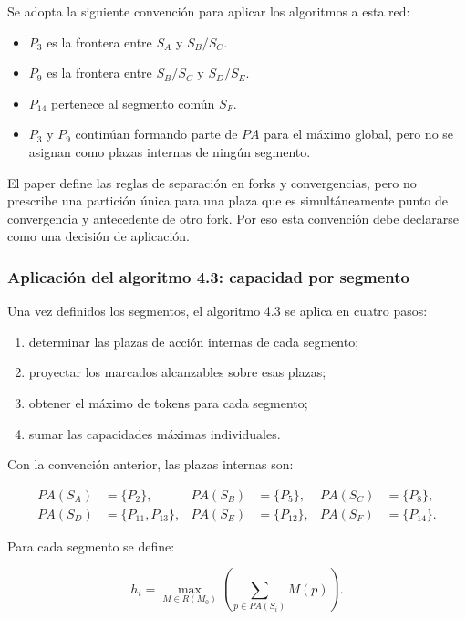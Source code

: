 \documentclass[11pt,a4paper]{article}
\begin{document}
Se adopta la siguiente convención para aplicar los algoritmos a esta red:

\begin{itemize}
    \item $P_3$ es la frontera entre $S_A$ y $S_B/S_C$.
    \item $P_9$ es la frontera entre $S_B/S_C$ y $S_D/S_E$.
    \item $P_{14}$ pertenece al segmento común $S_F$.
    \item $P_3$ y $P_9$ continúan formando parte de $PA$ para el máximo global,
    pero no se asignan como plazas internas de ningún segmento.
\end{itemize}

El paper define las reglas de separación en forks y convergencias, pero no
prescribe una partición única para una plaza que es simultáneamente punto de
convergencia y antecedente de otro fork. Por eso esta convención debe
declararse como una decisión de aplicación.

\subsubsection{Aplicación del algoritmo 4.3: capacidad por segmento}

Una vez definidos los segmentos, el algoritmo 4.3 se aplica en cuatro pasos:

\begin{enumerate}
    \item determinar las plazas de acción internas de cada segmento;
    \item proyectar los marcados alcanzables sobre esas plazas;
    \item obtener el máximo de tokens para cada segmento;
    \item sumar las capacidades máximas individuales.
\end{enumerate}

Con la convención anterior, las plazas internas son:

\begin{align*}
    PA(S_A)&=\{P_2\}, & PA(S_B)&=\{P_5\}, & PA(S_C)&=\{P_8\},\\
    PA(S_D)&=\{P_{11},P_{13}\}, & PA(S_E)&=\{P_{12}\}, & PA(S_F)&=\{P_{14}\}.
\end{align*}

Para cada segmento se define:

\begin{equation}
    h_i=\max_{M\in R(M_0)}
    \left(\sum_{p\in PA(S_i)}M(p)\right).
\end{equation}
\end{document}
